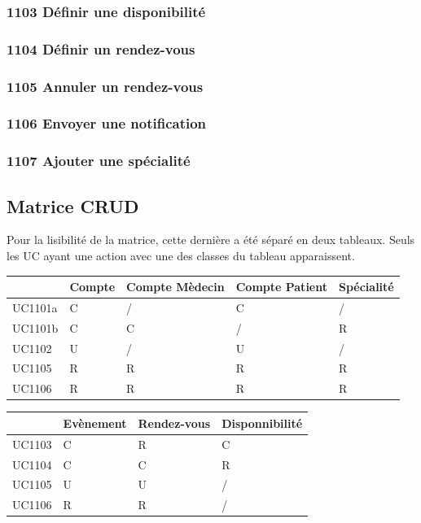 \documentclass[a4paper, 11pt]{report}
\begin{document}
\subsubsection{1103 Définir une disponibilité}
\subsubsection{1104 Définir un rendez-vous}
\subsubsection{1105 Annuler un rendez-vous}
\subsubsection{1106 Envoyer une notification}
\subsubsection{1107 Ajouter une spécialité}
\newpage
\subsection{Matrice CRUD}

Pour la lisibilité de la matrice, cette dernière a été séparé en deux tableaux.
Seuls les UC ayant une action avec une des classes du tableau apparaissent.

\begin{center}
    \begin{longtable}{|p{1.5cm}|p{1.5cm}|p{1.5cm}|p{1.5cm}|p{1.5cm}|}
        \hline
        & Compte & Compte Mèdecin & Compte Patient & Spécialité \\
        \hline
        UC1101a & C & / & C & / \\
        \hline
        UC1101b & C & C & / & R \\
        \hline
        UC1102  & U & / & U & / \\
        \hline
        UC1105  & R & R & R & R \\
        \hline
        UC1106 & R & R & R & R \\
        \hline
        
    \end{longtable}
\end{center}

\begin{center}
    \begin{longtable}{|p{2.2cm}|p{2.2cm}|p{2.2cm}|p{2.2cm}|}
        \hline
        & Evènement & Rendez-vous & Disponnibilité  \\
        \hline
        UC1103 & C & R & C \\
        \hline 
        UC1104 & C & C & R \\
        \hline
        UC1105 & U & U & / \\
        \hline
        UC1106 & R & R & / \\
        \hline
        
    \end{longtable}
\end{center}
\end{document}
